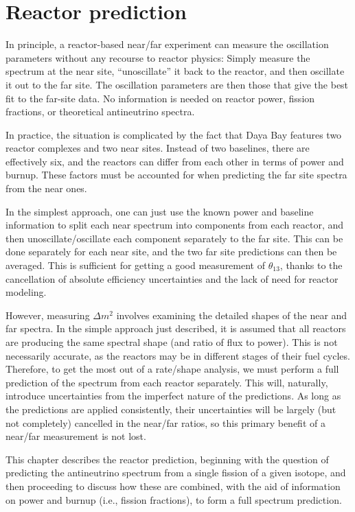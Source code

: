 \documentclass[../thesis.tex]{subfiles}
\begin{document}
\chapter{Reactor prediction}
\label{chap:reactor}


In principle, a reactor-based near/far experiment can measure the oscillation
parameters without any recourse to reactor physics: Simply measure the spectrum
at the near site, ``unoscillate'' it back to the reactor, and then oscillate it
out to the far site. The oscillation parameters are then those that give the
best fit to the far-site data. No information is needed on reactor power,
fission fractions, or theoretical antineutrino spectra.

In practice, the situation is complicated by the fact that Daya Bay features two
reactor complexes and two near sites. Instead of two baselines, there are
effectively six, and the reactors can differ from each other in terms of power
and burnup. These factors must be accounted for when predicting the far site
spectra from the near ones.

In the simplest approach, one can just use the known power and baseline
information to split each near spectrum into components from each reactor, and
then unoscillate/oscillate each component separately to the far site. This can
be done separately for each near site, and the two far site predictions can then
be averaged. This is sufficient for getting a good measurement of $\theta_{13}$,
thanks to the cancellation of absolute efficiency uncertainties and the lack of
need for reactor modeling.

However, measuring $\Delta m^2$ involves examining the detailed shapes of the
near and far spectra. In the simple approach just described, it is assumed that
all reactors are producing the same spectral shape (and ratio of flux to
power). This is not necessarily accurate, as the reactors may be in different
stages of their fuel cycles. Therefore, to get the most out of a rate/shape
analysis, we must perform a full prediction of the spectrum from each reactor
separately. This will, naturally, introduce uncertainties from the imperfect
nature of the predictions. As long as the predictions are applied consistently,
their uncertainties will be largely (but not completely) cancelled in the
near/far ratios, so this primary benefit of a near/far measurement is not lost.

This chapter describes the reactor prediction, beginning with the question of
predicting the antineutrino spectrum from a single fission of a given isotope,
and then proceeding to discuss how these are combined, with the aid of
information on power and burnup (i.e., fission fractions), to form a full
spectrum prediction.
\end{document}
